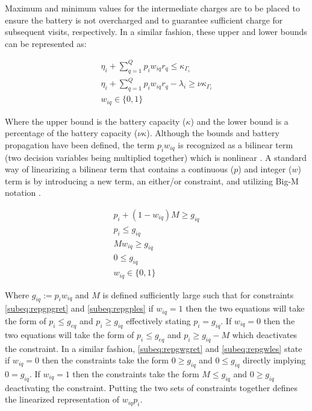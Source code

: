\documentclass[letterpaper, 10pt, conference]{IEEEtran}
\begin{document}
Maximum and minimum values for the intermediate charges are to be placed to ensure the battery is not overcharged and to guarantee sufficient charge for subsequent visits, respectively. In a similar fashion, these upper and lower bounds can be represented as:

\begin{subequations}
\begin{align*}
    \eta_i + \sum_{q=1}^Q p_i w_{iq} r_q \leq \kappa_{\Gamma_i}                 \\
    \eta_i + \sum_{q=1}^Q p_i w_{iq} r_q - \lambda_i \geq \nu \kappa_{\Gamma_i} \\
    w_{iq} \in \{0,1\}
\end{align*}
\end{subequations}

Where the upper bound is the battery capacity (\(\kappa\)) and the lower bound is a percentage of the battery capacity (\(\nu \kappa\)). Although the bounds and battery propagation have been defined, the term \(p_i w_{iq}\) is recognized as a bilinear term (two decision variables being multiplied together) which is nonlinear \cite{Rodriguez2013}. A standard way of linearizing a bilinear term that contains a continuous (\(p\)) and integer (\(w\)) term is by introducing a new term, an either/or constraint, and utilizing Big-M notation \cite{Chen2010,Rodriguez2013}.

\begin{subequations}
\begin{align}
    p_i + (1 - w_{iq})M \geq g_{iq}                                           \label{subeq:repgpgret}       \\
    p_i \leq g_{iq}                                                           \label{subeq:repgples}        \\
    Mw_{iq} \geq g_{iq}                                                       \label{subeq:repgwgret}       \\
    0 \leq g_{iq}                                                             \label{subeq:repgwles}        \\
    w_{iq} \in \{0,1\}
\end{align}
\end{subequations}

Where \(g_{iq} := p_i w_{iq}\) and \(M\) is defined sufficiently large such that for constraints \eqref{subeq:repgpgret} and \eqref{subeq:repgples} if \(w_{iq} = 1\) then the two equations will take the form of \(p_i \leq g_{eq}\) and \(p_i \geq g_{iq}\) effectively stating \(p_i = g_{iq}\). If \(w_{iq} = 0\) then the two equations will take the form of \(p_i \leq g_{eq}\) and \(p_i \geq g_{iq} - M\) which deactivates the constraint. In a similar fashion, \eqref{subeq:repgwgret} and \eqref{subeq:repgwles} state if \(w_{iq} = 0\) then the constraints take the form \(0 \geq g_{iq}\) and \(0 \leq g_{iq}\) directly implying \(0 = g_{iq}\). If \(w_{iq} = 1\) then the constraints take the form \(M \leq g_{iq}\) and \(0 \geq g_{iq}\) deactivating the constraint. Putting the two sets of constraints together defines the linearized representation of \(w_{iq} p_i\).
\end{document}
